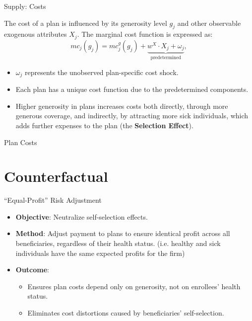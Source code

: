 \documentclass[professionalfonts, aspectratio=169]{beamer}
\begin{document}
\begin{frame}{Supply: Costs}

  The cost of a plan is influenced by its generosity level $g_j$ and other observable exogenous attributes $X_j$. The marginal cost function is expressed as:
  \begin{equation}
    \label{eq:marginal_cost}
    mc_j(g_j) = mc_j^g(g_j) + \underbrace{w^X \cdot X_j + \omega_j}_{\text{predetermined}},
  \end{equation}
  \begin{itemize}\small
    \item $\omega_j$ represents the unobserved plan-specific cost shock.
    \item Each plan has a unique cost function due to the predetermined components.
    \item Higher generosity in plans increases costs both directly, through more generous coverage, and indirectly, by attracting more sick individuals, which adds further expenses to the plan (the \textbf{Selection Effect}).
  \end{itemize}
\end{frame}

\begin{frame}{Plan Costs}
  
\end{frame}

\section{Counterfactual}

\begin{frame}{``Equal-Profit'' Risk Adjustment}
  \begin{itemize}
    \item \textbf{Objective}: Neutralize self-selection effects.
    \item \textbf{Method}: 
    Adjust payment to plans to ensure identical profit across all beneficiaries, regardless of their health status. (i.e. healthy and sick individuals have the same expected profits for the firm)
    \item \textbf{Outcome}:
      \begin{itemize}
        \item Ensures plan costs depend only on generosity, not on enrollees' health status.
        \item Eliminates cost distortions caused by beneficiaries' self-selection.
      \end{itemize}
  \end{itemize}
\end{frame}
\end{document}
